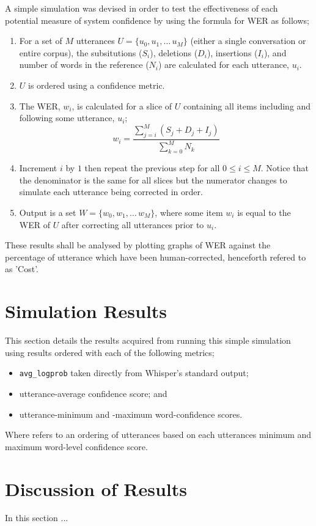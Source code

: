 A simple simulation was devised in order to test the effectiveness of each potential measure of system confidence by using the formula for WER as follows;

\begin{enumerate}
  \item For a set of $M$ utterances $U = \{ u_{0}, u_{1}, \ldots\, u_{M} \}$ (either a single conversation or entire corpus), the subsitutions ($S_i$), deletions ($D_i$), insertions ($I_i$), and number of words in the reference ($N_i$) are calculated for each utterance, $u_i$.
  \item $U$ is ordered using a confidence metric.
  \item The WER, $w_i$, is calculated for a slice of $U$ containing all items including and following some utterance, $u_i$;
    \[
      w_i = \frac{\sum_{j=i}^{M} (S_j + D_j + I_j)}{\sum_{k=0}^{M} N_k}
    \]
  \item Increment $i$ by $1$ then repeat the previous step for all $0 \leq i \leq M$.
    Notice that the denominator is the same for all slices but the numerator changes to simulate each utterance being corrected in order.
  \item Output is a set $W = \{ w_{0}, w_{1}, \ldots\, w_{M} \}$, where some item $w_{i}$ is equal to the WER of $U$ after correcting all utterances prior to $u_i$.
\end{enumerate}

These results shall be analysed by plotting graphs of WER against the percentage of utterance which have been human-corrected, henceforth refered to as 'Cost'.

\section{Simulation Results}

This section details the results acquired from running this simple simulation using results ordered with each of the following metrics;

\begin{itemize}
  \item \texttt{avg\_logprob} taken directly from Whisper's standard output;
  \item utterance-average confidence score; and
  \item utterance-minimum and -maximum word-confidence scores.
\end{itemize}

Where  refers to an ordering of utterances based on each utterances minimum and maximum word-level confidence score.



\clearpage
\section{Discussion of Results}
In this section ...
